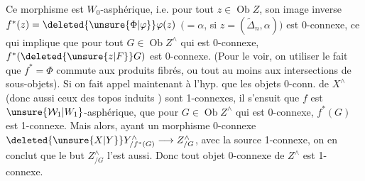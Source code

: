 Ce morphisme est $W_0$-asphérique, i.e. pour tout $z\in\operatorname{Ob}Z$, son image inverse $f^*(z)=\deleted{\unsure{\Phi|\varphi}}\varphi(z)$ $(=\alpha$, si $z=(\widetilde\Delta_n,\alpha))$ est 0-connexe, ce qui implique que pour tout $G\in\operatorname{Ob}Z^\wedge$ qui est 0-connexe, \deleted{$\unsure{\Phi|\varphi}$} $f^*(\deleted{\unsure{z|F}}G)$ est 0-connexe. (Pour le voir, on  utiliser le fait que $f^*=\Phi$ commute aux produits fibrés, ou tout au moins aux intersections de sous-objets).
Si on fait appel maintenant à l'hyp. que les objets 0-conn. de $X^\wedge$ (donc aussi ceux des topos induits ) sont 1-connexes, il s'ensuit que $f$ est  $\unsure{\mathcal W_1|W_1}$-asphérique,   que pour   $G\in\operatorname{Ob}Z^\wedge$ qui est 0-connexe, $f^*(G)$ est 1-connexe.
Mais alors, ayant un morphisme 0-connexe $\deleted{\unsure{X|Y}}Y^\wedge_{/f^*(G)}\longrightarrow Z^\wedge_{/G}$, avec la source 1-connexe, on en conclut que le but $Z^\wedge_{/G}$ l'est aussi. Donc tout objet 0-connexe de $Z^\wedge$ est 1-connexe.
